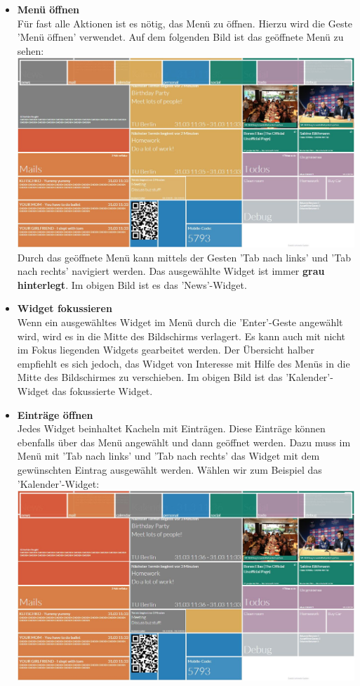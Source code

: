 \documentclass[10pt,a4paper]{report}
\begin{document}
			\begin{itemize}
				\item \textbf{Menü öffnen}\\
				Für fast alle Aktionen ist es nötig, das Menü zu öffnen. Hierzu wird die Geste 'Menü öffnen' verwendet. Auf dem folgenden Bild ist das geöffnete Menü zu sehen:\\
				\includegraphics[width=\linewidth]{Menu1}\\
				Durch das geöffnete Menü kann mittels der Gesten 'Tab nach links' und 'Tab nach rechts' navigiert werden. Das ausgewählte Widget ist immer \textbf{grau hinterlegt}. Im obigen Bild ist es das 'News'-Widget.
				\item \textbf{Widget fokussieren}\\
				Wenn ein ausgewähltes Widget im Menü durch die 'Enter'-Geste angewählt wird, wird es in die Mitte des Bildschirms verlagert. Es kann auch mit nicht im Fokus liegenden Widgets gearbeitet werden. Der Übersicht halber empfiehlt es sich jedoch, das Widget von Interesse mit Hilfe des Menüs in die Mitte des Bildschirmes zu verschieben. Im obigen Bild ist das 'Kalender'-Widget das fokussierte Widget.
				\item \textbf{Einträge öffnen}\\
				Jedes Widget beinhaltet Kacheln mit Einträgen. Diese Einträge können ebenfalls über das Menü angewählt und dann geöffnet werden. Dazu muss im Menü mit 'Tab nach links' und 'Tab nach rechts' das Widget mit dem gewünschten Eintrag ausgewählt werden. Wählen wir zum Beispiel das 'Kalender'-Widget:\\
				\includegraphics[width=\linewidth]{MenuSelect}\\

\end{itemize}
\end{document}
